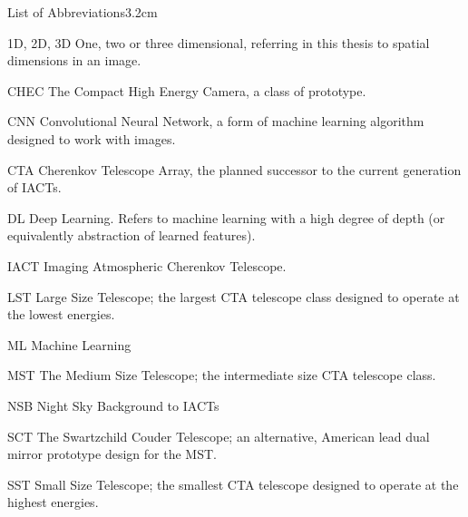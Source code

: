 \begin{mclistof}{List of Abbreviations}{3.2cm}

\item[1D, 2D, 3D] One, two or three dimensional, referring in this thesis to spatial dimensions in an image.

\item[CHEC] The Compact High Energy Camera, a class of prototype.
\item[CNN] Convolutional Neural Network, a form of machine learning algorithm designed to work with images.
\item[CTA] Cherenkov Telescope Array, the planned successor to the current generation of IACTs.
\item{DL} Deep Learning. Refers to machine learning with a high degree of depth (or equivalently abstraction of learned features).
\item[IACT]Imaging Atmospheric Cherenkov Telescope.
\item[LST] Large Size Telescope; the largest CTA telescope class designed to operate at the lowest energies.
\item[ML] Machine Learning
\item[MST] The Medium Size Telescope; the intermediate size CTA telescope class.
\item[NSB] Night Sky Background to IACTs
\item[SCT] The Swartzchild Couder Telescope; an alternative, American lead dual mirror prototype design for the MST.
\item[SST] Small Size Telescope; the smallest CTA telescope designed to operate at the highest energies.

\end{mclistof} 
